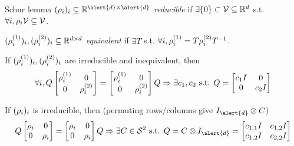 \begin{frame}{Schur lemma}
  \noindent$(\induced_i)_i\subseteq \R^{\alert{d} \times \alert{d}}$ \emph{reducible} if $\exists \{0\} \subset \mathcal{V} \subseteq \mathbb{R}^d$ s.t. $\forall i, \rho_i \mathcal{V} \subseteq \mathcal{V}$.

  \noindent$(\rho^{(1)}_i)_i, (\rho^{(2)}_i)_i \subseteq \mathbb{R}^{d \times d}$ \emph{equivalent} if $\exists T$ s.t. $\forall i, \rho^{(1)}_i = T\rho^{(2)}_iT^{-1}$.

  If $(\rho^{(1)}_i)_i, (\rho^{(2)}_i)_i$ are irreducible and inequivalent, then
  $$
  \forall i,
  Q
  \begin{bmatrix}
    \rho^{(1)}_i & 0\\
    0 & \rho^{(2)}_i
  \end{bmatrix}
    =
  \begin{bmatrix}
    \rho^{(1)}_i & 0\\
    0 & \rho^{(2)}_i
  \end{bmatrix}
  Q
  \Rightarrow
  \exists c_1, c_2 \text{ s.t. }
  Q =
  \begin{bmatrix}
    c_1 I & 0\\
    0 & c_2 I
  \end{bmatrix}
  $$

  If $(\rho_i)_i$ is irreducible, then (permuting rows/columns give
  $I_{\alert{d}} \otimes C$)
  $$
  Q
  \begin{bmatrix}
    \induced_i & 0\\
    0 & \induced_i
  \end{bmatrix}
    =
  \begin{bmatrix}
    \induced_i & 0\\
    0 & \induced_i
  \end{bmatrix}
  Q
  \Rightarrow
  \exists C \in \SymK[2] \text{ s.t. }
  Q = C \otimes I_{\alert{d}} =
  \begin{bmatrix}
    c_{1,1}I & c_{1,2}I\\
    c_{1,2}I & c_{2,2}I
  \end{bmatrix}
  $$


\end{frame}

